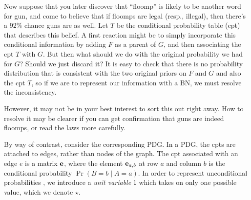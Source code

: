 \documentclass{article}
\newcommand{\MN}{PDG}
\numberwithin{equation}{section}
\begin{document}
\begin{notfocus}
\begin{example}
		Now suppose that you later discover that ``floomp'' is likely to be another word for gun, and come to believe that if floomps are legal (resp., illegal), then there's a 92\% chance guns are as well.
		Let $T$ be the conditional probability table (cpt) that describes this belief.
		A first reaction might be to simply incorporate this conditional information by
		adding $F$ as a parent of $G$, and then associating the cpt $T$ with $G$.
		But then what should we do with the original probability we had
		for $G$?  Should we just discard it?
		It is easy to check that there is no probability distribution that is
		consistent with the two original priors on $F$ and $G$ and also the cpt
		$T$, so if we are to represent our information with a BN, we must
		resolve the inconsistency.  
			
			
		However, it may not be in your best interest to sort this out right away.
		How to resolve it may be clearer if you can get confirmation
		that guns are indeed floomps, or read the laws more carefully.


		By way of contrast, consider the corresponding \MN. In a \MN, the cpts
		are attached to edges, rather than nodes of the graph.  
		The cpt associated with an edge $e$ is a matrix
		$\mathbf e$, where the element $\mathbf e_{a,b}$ at row $a$ and column $b$
		is the conditional probability $\Pr(B \!\!=\!\!b \mid A \!\!=\!\! a)$.  
		In order to represent unconditional probabilities%
		, we introduce a \emph{unit variable} $\mathsf 1$ %
		which takes on only one possible value,	which we denote $\star$.
		

\end{example}
\end{notfocus}
\end{document}

